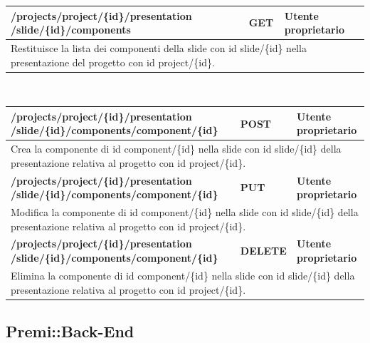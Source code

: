 \begin{table}[H]
	\begin{tabular}{|p{}|p{}|p{}|}
		\toprule
		\textbf{/projects/project/\{id\}/presentation
			/slide/\{id\}/components} & \textbf{GET} & \textbf{Utente proprietario} \\ \midrule
		\multicolumn{3}{|p{1.0\textwidth}|}{Restituisce la lista dei componenti della slide con id slide/\{id\} nella presentazione del progetto con id project/\{id\}.} \\
		\bottomrule
	\end{tabular}\\
	\par\bigskip
	\begin{tabular}{|p{}|p{}|p{}|}
		\toprule
		\textbf{/projects/project/\{id\}/presentation
			/slide/\{id\}/components/component/\{id\}} & \textbf{POST} & \textbf{Utente proprietario} \\ \midrule
		\multicolumn{3}{|p{1.0\textwidth}|}{Crea la componente di id component/\{id\} nella slide con id slide/\{id\} della presentazione relativa al progetto con id project/\{id\}.} \\
		\bottomrule
		\textbf{/projects/project/\{id\}/presentation
			/slide/\{id\}/components/component/\{id\}} & \textbf{PUT} & \textbf{Utente proprietario} \\ \midrule
		\multicolumn{3}{|p{1.0\textwidth}|}{Modifica la componente di id component/\{id\} nella slide con id slide/\{id\} della presentazione relativa al progetto con id project/\{id\}.} \\
		\bottomrule
		\textbf{/projects/project/\{id\}/presentation
			/slide/\{id\}/components/component/\{id\}} & \textbf{DELETE} & \textbf{Utente proprietario} \\ \midrule
		\multicolumn{3}{|p{1.0\textwidth}|}{Elimina la componente di id component/\{id\} nella slide con id slide/\{id\} della presentazione relativa al progetto con id project/\{id\}.} \\
		\bottomrule
	\end{tabular}	
\end{table}

\newpage
\subsection{Premi::Back-End}
